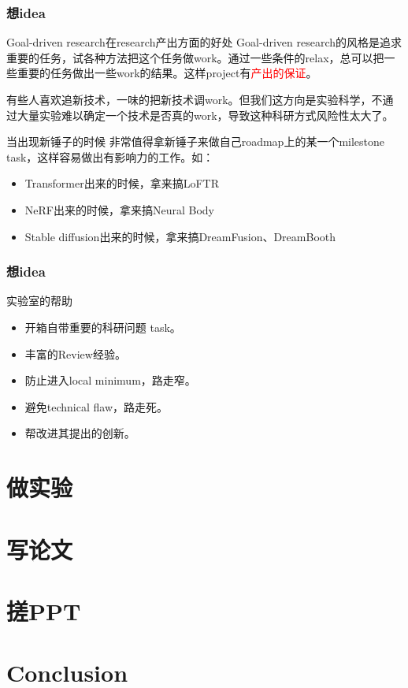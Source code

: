 \documentclass{beamer}
\begin{document}
\begin{frame}
    \frametitle{想idea}
    \begin{block}{Goal-driven research在research产出方面的好处}
        Goal-driven research的风格是追求重要的任务，试各种方法把这个任务做work。通过一些条件的relax，总可以把一些重要的任务做出一些work的结果。这样project有\textcolor{red}{产出的保证}。

        有些人喜欢追新技术，一味的把新技术调work。但我们这方向是实验科学，不通过大量实验难以确定一个技术是否真的work，导致这种科研方式风险性太大了。
    \end{block}
    \begin{block}{当出现新锤子的时候}
        非常值得拿新锤子来做自己roadmap上的某一个milestone task，这样容易做出有影响力的工作。如：
        \begin{itemize}
            \item Transformer出来的时候，拿来搞LoFTR
            \item NeRF出来的时候，拿来搞Neural Body
            \item Stable diffusion出来的时候，拿来搞DreamFusion、DreamBooth
        \end{itemize}
    \end{block}
\end{frame}

\begin{frame}
    \frametitle{想idea}
    \begin{block}{实验室的帮助}
        \begin{itemize}
            \item 开箱自带重要的科研问题 task。
            \item 丰富的Review经验。
            \item 防止进入local minimum，路走窄。
            \item 避免technical flaw，路走死。
            \item 帮改进其提出的创新。
        \end{itemize}
    \end{block}
\end{frame}


\section{做实验}

\section{写论文}

\section{搓PPT}

\section{Conclusion}
\end{document}
